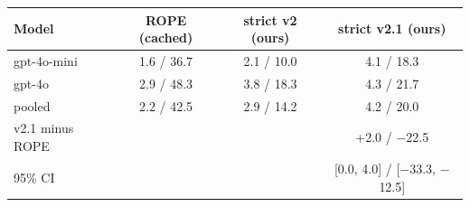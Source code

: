\begin{tabular}{@{}lccc@{}}
\toprule
Model & ROPE (cached) & \textbf{strict v2 (ours)} & \textbf{strict v2.1 (ours)} \\
\midrule
gpt-4o-mini & 1.6 / 36.7 & 2.1 / 10.0 & 4.1 / 18.3 \\
gpt-4o & 2.9 / 48.3 & 3.8 / 18.3 & 4.3 / 21.7 \\
pooled & 2.2 / 42.5 & 2.9 / 14.2 & 4.2 / 20.0 \\
v2.1 minus ROPE & & & +2.0 / $-$22.5 \\
95\% CI & & & [0.0, 4.0] / [$-$33.3, $-$12.5] \\
\bottomrule
\end{tabular}

